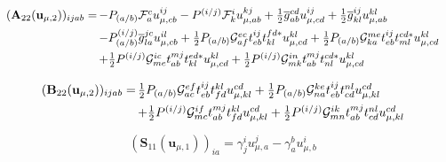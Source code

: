 \begin{subappendices}
\begin{equation}
    \begin{array}{r@{\,}l}
        (\mathbf{A}_{22}(\mathbf{u}_{\mu,2}))_{ijab}
        =
        &
        -
        P_{(a/b)}
        \mathcal{F}_a^c
        u_{\mu,cb}^{ij}
        -
        P^{(i/j)}
        \mathcal{F}_k^i
        u_{\mu,ab}^{kj}
        +
        \tfrac{1}{2}
        \overline{g}_{ab}^{cd}
        u_{\mu,cd}^{ij}
        +
        \tfrac{1}{2}
        \overline{g}_{kl}^{ij}
        u_{\mu,ab}^{kl}
        \\[5pt]
        &
        -
        P_{(a/b)}^{(i/j)}
        \overline{g}_{la}^{jc}
        u_{\mu,cb}^{il}
        +
        \tfrac{1}{2}
        P_{(a/b)}
        \mathcal{G}_{af}^{ec}
        t_{eb}^{ij}
        t_{kl}^{fd*}
        u_{\mu,cd}^{kl}
        +
        \tfrac{1}{2}
        P_{(a/b)}
        \mathcal{G}_{ka}^{me}
        t_{eb}^{ij}
        t_{ml}^{cd*}
        u_{\mu,cd}^{kl}
        \\[5pt]
        &
        +
        \tfrac{1}{2}
        P^{(i/j)}
        \mathcal{G}_{me}^{ic}
        t_{ab}^{mj}
        t_{kl}^{ed*}
        u_{\mu,cd}^{kl}
        +
        \tfrac{1}{2}
        P^{(i/j)}
        \mathcal{G}_{mk}^{in}
        t_{ab}^{mj}
        t_{nl}^{cd*}
        u_{\mu,cd}^{kl}
    \end{array}
\end{equation}

\begin{equation}
    \begin{array}{r@{\,}l}
        (\mathbf{B}_{22}(\mathbf{u}_{\mu,2}))_{ijab}
        =
        &
        \tfrac{1}{2}
        P_{(a/b)}
        \mathcal{G}_{ac}^{ef}
        t_{eb}^{ij}
        t_{fd}^{kl}
        u_{\mu,kl}^{cd}
        +
        \tfrac{1}{2}
        P_{(a/b)}
        \mathcal{G}_{na}^{ke}
        t_{eb}^{ij}
        t_{cd}^{nl}
        u_{\mu,kl}^{cd}
        \\[5pt]
        &
        +
        \tfrac{1}{2}
        P^{(i/j)}
        \mathcal{G}_{mc}^{if}
        t_{ab}^{mj}
        t_{fd}^{kl}
        u_{\mu,kl}^{cd}
        +
        \tfrac{1}{2}
        P^{(i/j)}
        \mathcal{G}_{mn}^{ik}
        t_{ab}^{mj}
        t_{cd}^{nl}
        u_{\mu,kl}^{cd}
    \end{array}
\end{equation}

\begin{equation}
    (\mathbf{S}_{11}(\mathbf{u}_{\mu,1}))_{ia}
    =
    \gamma^i_j
    u_{\mu,a}^j
    -
    \gamma^b_a
    u_{\mu,b}^i
\end{equation}


\end{subappendices}
